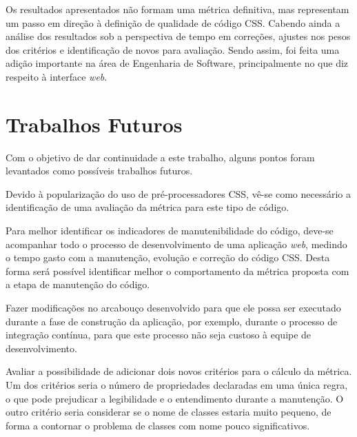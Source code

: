 Os resultados apresentados não formam uma métrica definitiva, mas representam um passo em direção à definição de qualidade de código CSS. Cabendo ainda a análise dos resultados sob a perspectiva de tempo em correções, ajustes nos pesos dos critérios e identificação de novos  para avaliação. Sendo assim, foi feita uma adição importante na área de Engenharia de Software, principalmente no que diz respeito à interface \textit{web}.

\section{Trabalhos Futuros}

Com o objetivo de dar continuidade a este trabalho, alguns pontos foram levantados como possíveis trabalhos futuros.

Devido à popularização do uso de pré-processadores CSS, vê-se como necessário a identificação de uma avaliação da métrica para este tipo de código.

Para melhor identificar os indicadores de manutenibilidade do código, deve-se acompanhar todo o processo de desenvolvimento de uma aplicação \textit{web}, medindo o tempo gasto com a manutenção, evolução e correção do código CSS. Desta forma será possível identificar melhor o comportamento da métrica proposta com a etapa de manutenção do código.

Fazer modificações no arcabouço desenvolvido para que ele possa ser executado durante a fase de construção da aplicação, por exemplo, durante o processo de integração contínua, para que este processo não seja custoso à equipe de desenvolvimento.

Avaliar a possibilidade de adicionar dois novos critérios para o cálculo da métrica. Um dos critérios seria o número de propriedades declaradas em uma única regra, o que pode prejudicar a legibilidade e o entendimento durante a manutenção. O outro critério seria considerar se o nome de classes estaria muito pequeno, de forma a contornar o problema de classes com nome pouco significativos.